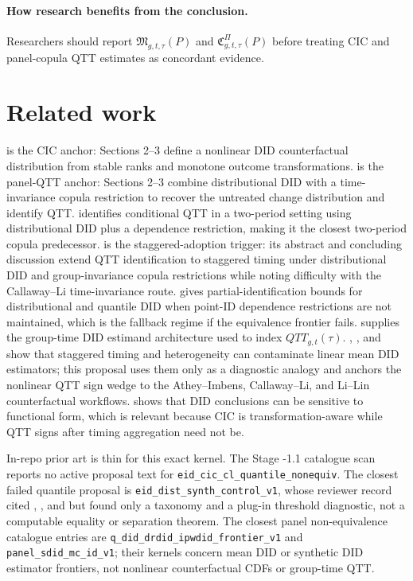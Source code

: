 \documentclass[11pt]{article}
\theoremstyle{definition}
\theoremstyle{plain}
\theoremstyle{remark}
\begin{document}
\paragraph{How research benefits from the conclusion.}
Researchers should report \(\mathfrak M_{g,t,\tau}(P)\) and \(\mathfrak C^{\Pi}_{g,t,\tau}(P)\) before treating CIC and panel-copula QTT estimates as concordant evidence.

\section{Related work}
\citet{AtheyImbens2006} is the CIC anchor: Sections 2--3 define a nonlinear DID counterfactual distribution from stable ranks and monotone outcome transformations. \citet{CallawayLi2019} is the panel-QTT anchor: Sections 2--3 combine distributional DID with a time-invariance copula restriction to recover the untreated change distribution and identify QTT. \citet{CallawayLiOka2018} identifies conditional QTT in a two-period setting using distributional DID plus a dependence restriction, making it the closest two-period copula predecessor. \citet{LiLin2024} is the staggered-adoption trigger: its abstract and concluding discussion extend QTT identification to staggered timing under distributional DID and group-invariance copula restrictions while noting difficulty with the Callaway--Li time-invariance route. \citet{FanYu2012} gives partial-identification bounds for distributional and quantile DID when point-ID dependence restrictions are not maintained, which is the fallback regime if the equivalence frontier fails. \citet{CallawaySantAnna2021} supplies the group-time DID estimand architecture used to index \(QTT_{g,t}(\tau)\). \citet{GoodmanBacon2021}, \citet{SunAbraham2021}, and \citet{deChaisemartinDHaultfoeuille2020} show that staggered timing and heterogeneity can contaminate linear mean DID estimators; this proposal uses them only as a diagnostic analogy and anchors the nonlinear QTT sign wedge to the Athey--Imbens, Callaway--Li, and Li--Lin counterfactual workflows. \citet{RothSantAnna2023} shows that DID conclusions can be sensitive to functional form, which is relevant because CIC is transformation-aware while QTT signs after timing aggregation need not be.

In-repo prior art is thin for this exact kernel. The Stage -1.1 catalogue scan reports no active proposal text for \texttt{eid\_cic\_cl\_quantile\_nonequiv}. The closest failed quantile proposal is \texttt{eid\_dist\_synth\_control\_v1}, whose reviewer record cited \citet{AtheyImbens2006}, \citet{CallawayLi2019}, and \citet{FanYu2012} but found only a taxonomy and a plug-in threshold diagnostic, not a computable equality or separation theorem. The closest panel non-equivalence catalogue entries are \texttt{q\_did\_drdid\_ipwdid\_frontier\_v1} and \texttt{panel\_sdid\_mc\_id\_v1}; their kernels concern mean DID or synthetic DID estimator frontiers, not nonlinear counterfactual CDFs or group-time QTT.
\end{document}

